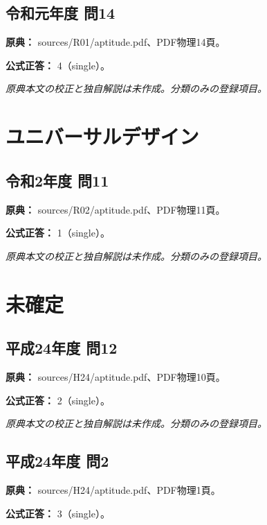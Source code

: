 \subsection{令和元年度 問14}
\label{q:r01-reg-apt-14}

\noindent\textbf{原典：} sources/R01/aptitude.pdf、PDF物理14頁。

\textbf{公式正答：} 4（single）。

\par\textit{原典本文の校正と独自解説は未作成。分類のみの登録項目。}

\section{ユニバーサルデザイン}

\subsection{令和2年度 問11}
\label{q:r02-reg-apt-11}

\noindent\textbf{原典：} sources/R02/aptitude.pdf、PDF物理11頁。

\textbf{公式正答：} 1（single）。

\par\textit{原典本文の校正と独自解説は未作成。分類のみの登録項目。}

\section{未確定}

\subsection{平成24年度 問12}
\label{q:h24-reg-apt-12}

\noindent\textbf{原典：} sources/H24/aptitude.pdf、PDF物理10頁。

\textbf{公式正答：} 2（single）。

\par\textit{原典本文の校正と独自解説は未作成。分類のみの登録項目。}

\subsection{平成24年度 問2}
\label{q:h24-reg-apt-02}

\noindent\textbf{原典：} sources/H24/aptitude.pdf、PDF物理1頁。

\textbf{公式正答：} 3（single）。

